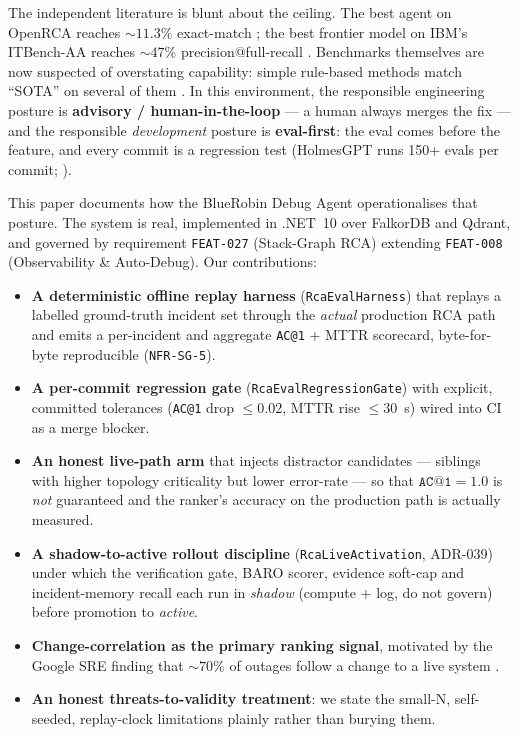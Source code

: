 \documentclass[11pt]{article}
\makeatletter
\newcommand{\acone}{\texttt{AC@1}}
\newcommand{\code}[1]{\texttt{#1}}
\makeatother
\begin{document}
The independent literature is blunt about the ceiling. The best agent on OpenRCA reaches
${\sim}11.3\%$ exact-match \citep{xu2025openrca}; the best frontier model on IBM's
ITBench-AA reaches ${\sim}47\%$ precision@full-recall \citep{aa2026itbenchaa}. Benchmarks
themselves are now suspected of overstating capability: simple rule-based methods match
``SOTA'' on several of them \citep{rethinking2025faultprop}. In this environment, the
responsible engineering posture is \textbf{advisory / human-in-the-loop} --- a human always
merges the fix --- and the responsible \emph{development} posture is \textbf{eval-first}:
the eval comes before the feature, and every commit is a regression test (HolmesGPT runs
150+ evals per commit; \citealp{holmesgpt,evaldriven}).

This paper documents how the BlueRobin Debug Agent operationalises that posture. The system
is real, implemented in .NET~10 over FalkorDB and Qdrant, and governed by requirement
\code{FEAT-027} (Stack-Graph RCA) extending \code{FEAT-008} (Observability \& Auto-Debug).
Our contributions:

\begin{itemize}
  \item \textbf{A deterministic offline replay harness} (\code{RcaEvalHarness}) that
  replays a labelled ground-truth incident set through the \emph{actual} production RCA path
  and emits a per-incident and aggregate \acone{} + MTTR scorecard, byte-for-byte
  reproducible (\code{NFR-SG-5}).
  \item \textbf{A per-commit regression gate} (\code{RcaEvalRegressionGate}) with explicit,
  committed tolerances (\acone{} drop $\le 0.02$, MTTR rise $\le 30$~s) wired into CI as a
  merge blocker.
  \item \textbf{An honest live-path arm} that injects distractor candidates --- siblings
  with higher topology criticality but lower error-rate --- so that $\acone{} = 1.0$ is
  \emph{not} guaranteed and the ranker's accuracy on the production path is actually
  measured.
  \item \textbf{A shadow-to-active rollout discipline} (\code{RcaLiveActivation}, ADR-039)
  under which the verification gate, BARO scorer, evidence soft-cap and incident-memory
  recall each run in \emph{shadow} (compute + log, do not govern) before promotion to
  \emph{active}.
  \item \textbf{Change-correlation as the primary ranking signal}, motivated by the Google
  SRE finding that ${\sim}70\%$ of outages follow a change to a live system
  \citep{beyer2016sre}.
  \item \textbf{An honest threats-to-validity treatment}: we state the small-N, self-seeded,
  replay-clock limitations plainly rather than burying them.
\end{itemize}
\end{document}
